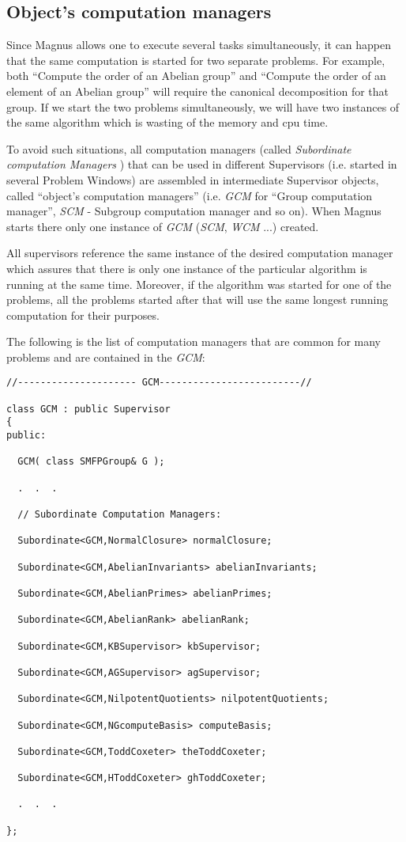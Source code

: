 \documentclass[12pt]{article}
\begin{document}
\subsection{Object's computation managers}

Since Magnus allows one to execute several tasks simultaneously, it can
happen that the same computation is started for two separate problems.
For example, both ``Compute the order of an Abelian group'' 
and ``Compute the order of an element of an Abelian group'' will require
the canonical decomposition for that group. If we start the two problems
simultaneously, we will have two instances of the same algorithm which
is wasting of the  memory  and cpu time. 

To avoid such situations, all
computation managers (called {\em Subordinate computation Managers} )
that can be used in different Supervisors (i.e.
started in several Problem Windows) are assembled in intermediate
Supervisor
objects, called ``object's computation managers'' (i.e. {\em GCM} 
for ``Group computation manager'', {\em SCM} - Subgroup
computation manager and so on). When Magnus starts there only one instance
of {\em GCM} ({\em SCM}, {\em WCM} ...) created. 

All supervisors reference
the same instance of the desired computation manager which assures
that there is only one instance of the particular algorithm is running at
the same time. Moreover, if the algorithm was started for one of the
problems, all the problems started after that will use the same longest
running computation for their purposes.

The following is the list of computation managers that are common
for many problems and are contained in  the {\em GCM}:

\footnotesize
\begin{verbatim}
//--------------------- GCM-------------------------//

class GCM : public Supervisor
{
public:

  GCM( class SMFPGroup& G );

  .  .  .

  // Subordinate Computation Managers:                                  

  Subordinate<GCM,NormalClosure> normalClosure;

  Subordinate<GCM,AbelianInvariants> abelianInvariants;

  Subordinate<GCM,AbelianPrimes> abelianPrimes;

  Subordinate<GCM,AbelianRank> abelianRank;

  Subordinate<GCM,KBSupervisor> kbSupervisor;

  Subordinate<GCM,AGSupervisor> agSupervisor;

  Subordinate<GCM,NilpotentQuotients> nilpotentQuotients;

  Subordinate<GCM,NGcomputeBasis> computeBasis;

  Subordinate<GCM,ToddCoxeter> theToddCoxeter;

  Subordinate<GCM,HToddCoxeter> ghToddCoxeter;

  .  .  .

};
\end{verbatim}
\normalsize
\end{document}
